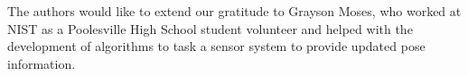 The authors would like to extend our gratitude to Grayson Moses, who worked at NIST as a Poolesville High School student volunteer and helped with the development of algorithms to task a sensor system to provide updated pose information.
